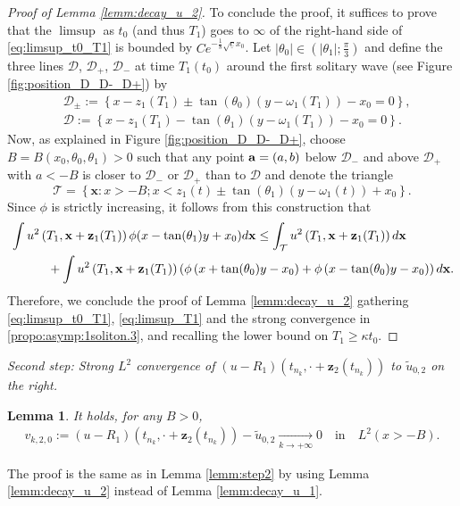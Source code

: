 \documentclass[reqno,10pt]{amsart}
\newtheorem{lemm}{Lemma}[section]
\numberwithin{equation}{section}
\newcommand{\bx}{\mathbf{x}}
\newcommand{\bz}{\mathbf{z}}
\begin{document}
\begin{proof}[Proof of Lemma \ref{lemm:decay_u_2}]
To conclude the proof, it suffices to prove that the $\limsup$ as $t_0$ (and thus $T_1$) goes to $\infty$ of the right-hand side of \eqref{eq:limsup_t0_T1} is bounded by $Ce^{-\frac18 \sqrt{\underline{c}}x_0}$. Let $\vert \theta_0 \vert \in (\vert \theta_1 \vert ; \frac{\pi}{3})$ and define the three lines $\mathcal{D}$, $\mathcal{D}_+$, $\mathcal{D}_-$ at time $T_1(t_0)$ around the first solitary wave (see Figure \ref{fig:position_D_D-_D+}) by
\begin{align*}
	& \mathcal{D}_\pm:= \left\{ x- z_1(T_1) \pm \tan(\theta_0) \left( y - \omega_1(T_1) \right) - x_0 =0\right\}, \\
	& \mathcal{D} := \left\{ x- z_1(T_1) -\tan(\theta_1) \left( y - \omega_1(T_1) \right)- x_0 =0 \right\}.
\end{align*}
Now, as explained in Figure \ref{fig:position_D_D-_D+}, choose $B=B(x_0,\theta_0,\theta_1)>0$ such that any point ${\bf a}=(a,b)$ below $\mathcal{D}_-$ and above $\mathcal{D}_+$ with $a<-B$ is closer to $\mathcal{D}_-$ or $\mathcal{D}_+$ than to $\mathcal{D}$ and denote the triangle $$\mathcal{T}=\left\{\bx : x>-B; x< z_1(t) \pm \tan(\theta_1) \left( y - \omega_1(t) \right) + x_0 \right\}. $$ 
Since $\phi$ is strictly increasing, it follows from this construction that 
\begin{align*}
	\MoveEqLeft
	\int u^2\left(T_1, \bx + \bz_1(T_1) \right) \phi (x -\tan(\theta_1)y+ x_0) d\bx \leq \int_{\mathcal{T}} u^2 \left(T_1, \bx + \bz_1(T_1) \right) d\bx \\
	& \quad + \int u^2\left(T_1, \bx + \bz_1(T_1) \right) \left( \phi \left( x + \tan(\theta_0) y- x_0 \right) +\phi \left( x - \tan(\theta_0) y- x_0 \right) \right) d\bx.
\end{align*}
Therefore, we conclude the proof of Lemma \ref{lemm:decay_u_2} gathering \eqref{eq:limsup_t0_T1}, \eqref{eq:limsup_T1} and the strong convergence in \eqref{propo:asymp:1soliton.3}, and recalling the lower bound on $T_1\geq \kappa t_0$.
\end{proof}

\vspace{0.5cm}
\noindent \textit{Second step: Strong $L^2$ convergence of $\left( u - R_1 \right) (t_{n_k}, \cdot + \bz_2(t_{n_k}))$ to $\tilde{u}_{0,2}$ on the right.}

\begin{lemm}
	It holds, for any $B>0$,
	\begin{align*}
		v_{k,2,0}:= \left( u - R_1 \right) (t_{n_k}, \cdot + \bz_2(t_{n_k}) ) - \tilde{u}_{0,2 } \underset{k\rightarrow +\infty}{\rightarrow} 0 \quad \text{in} \quad L^2(x>-B).
	\end{align*}
\end{lemm}
The proof is the same as in Lemma \ref{lemm:step2} by using Lemma \ref{lemm:decay_u_2} instead of Lemma \ref{lemm:decay_u_1}.
\end{document}
